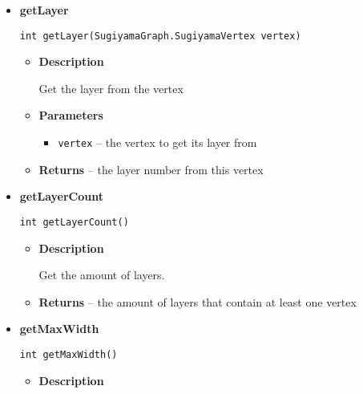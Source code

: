 {{{{{{{{{{{{{\begin{itemize}
{\begin{itemize}
{Get all vertices from a certain layer.
}
\item{
{\bf  Parameters}
  \begin{itemize}
   \item{
\texttt{layerN} -- the index of the layer}
  \end{itemize}
}%
\item{{\bf  Returns} -- 
a list of all vertices which are on this layer 
}%
\end{itemize}
}%
\item{ 
{\bf  getLayer}\\
\begin{lstlisting}[frame=none]
int getLayer(SugiyamaGraph.SugiyamaVertex vertex)\end{lstlisting} %
\begin{itemize}
\item{
{\bf  Description}

Get the layer from the vertex
}
\item{
{\bf  Parameters}
  \begin{itemize}
   \item{
\texttt{vertex} -- the vertex to get its layer from}
  \end{itemize}
}%
\item{{\bf  Returns} -- 
the layer number from this vertex 
}%
\end{itemize}
}%
\item{ 
{\bf  getLayerCount}\\
\begin{lstlisting}[frame=none]
int getLayerCount()\end{lstlisting} %
\begin{itemize}
\item{
{\bf  Description}

Get the amount of layers.
}
\item{{\bf  Returns} -- 
the amount of layers that contain at least one vertex 
}%
\end{itemize}
}%
\item{ 
{\bf  getMaxWidth}\\
\begin{lstlisting}[frame=none]
int getMaxWidth()\end{lstlisting} %
\begin{itemize}
\item{
{\bf  Description}

}
\end{itemize}}
\end{itemize}}}}}}}}}}}}}}

